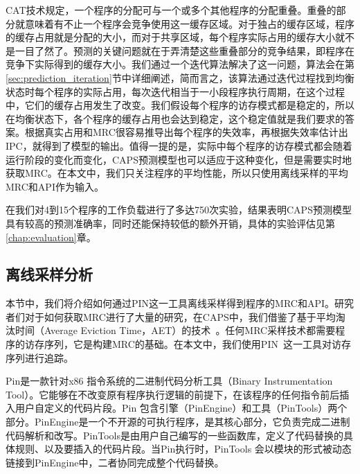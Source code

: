 CAT技术规定，一个程序的分配可与一个或多个其他程序的分配重叠。重叠的部分就意味着有不止一个程序会竞争使用这一缓存区域。对于独占的缓存区域，程序的缓存占用就是分配的大小，而对于共享区域，每个程序实际占用的缓存大小就不是一目了然了。预测的关键问题就在于弄清楚这些重叠部分的竞争结果，即程序在竞争下实际得到的缓存大小。我们通过一个迭代算法解决了这一问题，算法会在第\ref{sec:prediction_iteration}节中详细阐述，简而言之，该算法通过迭代过程找到均衡状态时每个程序的实际占用，每次迭代相当于一小段程序执行周期，在这个过程中，它们的缓存占用发生了改变。我们假设每个程序的访存模式都是稳定的，所以在均衡状态下，各个程序的缓存占用也会达到稳定，这个稳定值就是我们要求的答案。根据真实占用和MRC很容易推导出每个程序的失效率，再根据失效率估计出IPC，就得到了模型的输出。值得一提的是，实际中每个程序的访存模式都会随着运行阶段的变化而变化，CAPS预测模型也可以适应于这种变化，但是需要实时地获取MRC。在本文中，我们只关注程序的平均性能，所以只使用离线采样的平均MRC和API作为输入。

在我们对4到15个程序的工作负载进行了多达750次实验，结果表明CAPS预测模型具有较高的预测准确率，同时还能保持较低的额外开销，具体的实验评估见第\ref{chap:evaluation}章。


\subsection{离线采样分析} \label{sec:prediction_sample}
本节中，我们将介绍如何通过PIN这一工具离线采样得到程序的MRC和API。研究者们对于如何获取MRC进行了大量的研究，在CAPS中，我们借鉴了基于平均淘汰时间（Average Eviction Time，AET）的技术~\parencite{hu2016kinect}。任何MRC采样技术都需要程序的访存序列，它是构建MRC的基础。在本文中，我们使用PIN~\parencite{luk2005pin}这一工具对访存序列进行追踪。

Pin是一款针对x86 指令系统的二进制代码分析工具（Binary Instrumentation Tool）。它能够在不改变原有程序执行逻辑的前提下，在该程序的任何指令前后插入用户自定义的代码片段。Pin 包含引擎（PinEngine）和工具（PinTools）两个部分。PinEngine是一个不开源的可执行程序，是其核心部分，它负责完成二进制代码解析和改写。PinTools是由用户自己编写的一些函数库，定义了代码替换的具体规则、以及要插入的代码片段。当Pin执行时，PinTools 会以模块的形式被动态链接到PinEngine中，二者协同完成整个代码替换。

